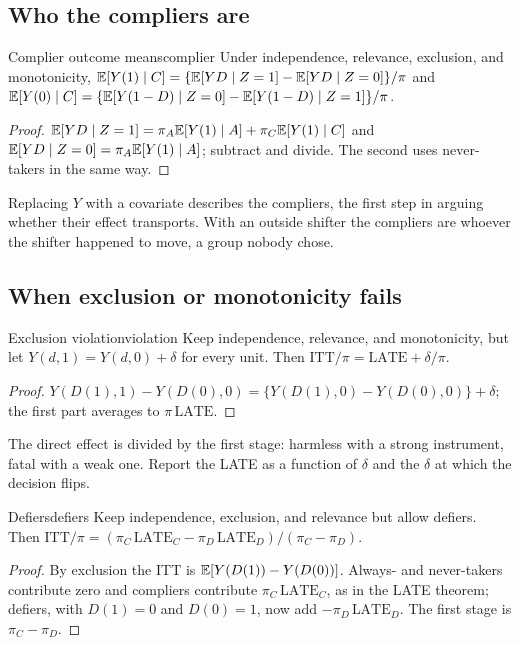 \documentclass[11pt]{article}
\begin{document}
\subsection{Who the compliers are}

\begin{prop}{Complier outcome means}{complier}
Under independence, relevance, exclusion, and monotonicity,
$\mathbb{E}[Y(1) \mid C] = \{\mathbb{E}[YD \mid Z=1] - \mathbb{E}[YD \mid Z=0]\}/\pi$ and $\mathbb{E}[Y(0) \mid C] = \{\mathbb{E}[Y(1-D) \mid Z=0] - \mathbb{E}[Y(1-D) \mid Z=1]\}/\pi$.
\end{prop}
\begin{proof}
$\mathbb{E}[YD \mid Z=1] = \pi_A\mathbb{E}[Y(1) \mid A] + \pi_C\mathbb{E}[Y(1) \mid C]$ and $\mathbb{E}[YD \mid Z=0] = \pi_A\mathbb{E}[Y(1) \mid A]$; subtract and divide. The second uses
never-takers in the same way.
\end{proof}

Replacing $Y$ with a covariate describes the compliers, the first step in arguing whether their effect transports. With an
outside shifter the compliers are whoever the shifter happened to move, a group nobody chose.

\subsection{When exclusion or monotonicity fails}

\begin{prop}{Exclusion violation}{violation}
Keep independence, relevance, and monotonicity, but let $Y(d,1) = Y(d,0) + \delta$ for every unit. Then
$\text{ITT}/\pi = \text{LATE} + \delta/\pi$.
\end{prop}
\begin{proof}
$Y(D(1),1) - Y(D(0),0) = \{Y(D(1),0) - Y(D(0),0)\} + \delta$; the first part averages to $\pi\,\text{LATE}$.
\end{proof}

The direct effect is divided by the first stage: harmless with a strong instrument, fatal with a weak one. Report the LATE as a
function of $\delta$ and the $\delta$ at which the decision flips.

\begin{prop}{Defiers}{defiers}
Keep independence, exclusion, and relevance but allow defiers. Then
$\text{ITT}/\pi = (\pi_C\,\text{LATE}_C - \pi_D\,\text{LATE}_D)/(\pi_C - \pi_D)$.
\end{prop}
\begin{proof}
By exclusion the ITT is $\mathbb{E}[Y(D(1)) - Y(D(0))]$. Always- and never-takers contribute zero and compliers contribute
$\pi_C\,\text{LATE}_C$, as in the LATE theorem; defiers, with $D(1) = 0$ and $D(0) = 1$, now add $-\pi_D\,\text{LATE}_D$. The
first stage is $\pi_C - \pi_D$.
\end{proof}
\end{document}
